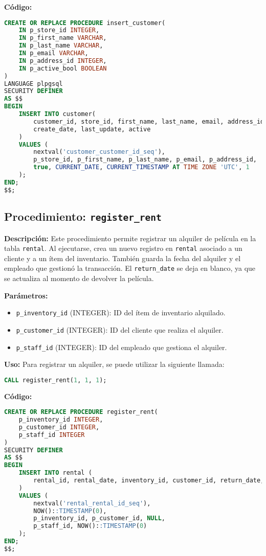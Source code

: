 \documentclass{article}
\begin{document}
\textbf{Código:}
\begin{lstlisting}[language=SQL]
CREATE OR REPLACE PROCEDURE insert_customer(
    IN p_store_id INTEGER,        
    IN p_first_name VARCHAR,      
    IN p_last_name VARCHAR,       
    IN p_email VARCHAR,           
    IN p_address_id INTEGER,      
    IN p_active_bool BOOLEAN      
)
LANGUAGE plpgsql
SECURITY DEFINER
AS $$
BEGIN
    INSERT INTO customer(
        customer_id, store_id, first_name, last_name, email, address_id, activebool, 
        create_date, last_update, active
    )
    VALUES (
        nextval('customer_customer_id_seq'),
        p_store_id, p_first_name, p_last_name, p_email, p_address_id,
        true, CURRENT_DATE, CURRENT_TIMESTAMP AT TIME ZONE 'UTC', 1
    );
END;
$$;
\end{lstlisting}

\subsection{Procedimiento: \texttt{register\_rent}}

\textbf{Descripción:}  
Este procedimiento permite registrar un alquiler de película en la tabla \texttt{rental}. Al ejecutarse, crea un nuevo registro en \texttt{rental} asociado a un cliente y a un ítem del inventario. También guarda la fecha del alquiler y el empleado que gestionó la transacción. El \texttt{return\_date} se deja en blanco, ya que se actualiza al momento de devolver la película.

\textbf{Parámetros:}
\begin{itemize}
    \item \texttt{p\_inventory\_id} (INTEGER): ID del ítem de inventario alquilado.
    \item \texttt{p\_customer\_id} (INTEGER): ID del cliente que realiza el alquiler.
    \item \texttt{p\_staff\_id} (INTEGER): ID del empleado que gestiona el alquiler.
\end{itemize}

\textbf{Uso:}
Para registrar un alquiler, se puede utilizar la siguiente llamada:

\begin{lstlisting}[language=SQL]
CALL register_rent(1, 1, 1);
\end{lstlisting}

\textbf{Código:}
\begin{lstlisting}[language=SQL]
CREATE OR REPLACE PROCEDURE register_rent(
    p_inventory_id INTEGER, 
    p_customer_id INTEGER, 
    p_staff_id INTEGER
)
SECURITY DEFINER
AS $$
BEGIN
    INSERT INTO rental (
        rental_id, rental_date, inventory_id, customer_id, return_date, staff_id, last_update
    )
    VALUES (
        nextval('rental_rental_id_seq'),  
        NOW()::TIMESTAMP(0),  
        p_inventory_id, p_customer_id, NULL,  
        p_staff_id, NOW()::TIMESTAMP(0)
    );
END;
$$;
\end{lstlisting}
\end{document}
